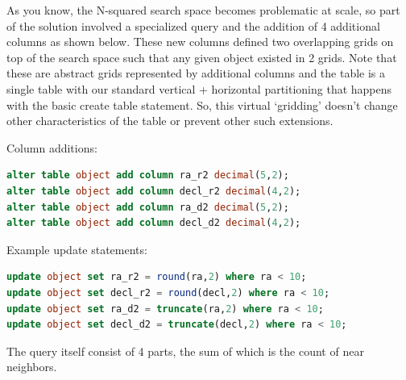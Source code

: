 \documentclass[DM,lsstdraft,toc]{lsstdoc}
\begin{document}
As you know, the N-squared search space becomes problematic at scale, so
part of the solution involved a specialized query and the addition of 4
additional columns as shown below. These new columns defined two
overlapping grids on top of the search space such that any given object
existed in 2 grids. Note that these are abstract grids represented by
additional columns and the table is a single table with our standard
vertical + horizontal partitioning that happens with the basic create
table statement. So, this virtual `gridding' doesn't change other
characteristics of the table or prevent other such extensions.

Column additions:

\begin{lstlisting}[language=SQL]
alter table object add column ra_r2 decimal(5,2);
alter table object add column decl_r2 decimal(4,2);
alter table object add column ra_d2 decimal(5,2);
alter table object add column decl_d2 decimal(4,2);
\end{lstlisting}

Example update statements:

\begin{lstlisting}[language=SQL]
update object set ra_r2 = round(ra,2) where ra < 10;
update object set decl_r2 = round(decl,2) where ra < 10;
update object set ra_d2 = truncate(ra,2) where ra < 10;
update object set decl_d2 = truncate(decl,2) where ra < 10;
\end{lstlisting}

The query itself consist of 4 parts, the sum of which is the count of
near neighbors.
\end{document}
